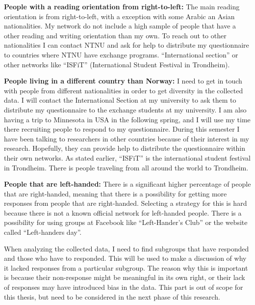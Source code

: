     {\bf People with a reading orientation from right-to-left:} The main reading orientation is from right-to-left, with a exception with some Arabic an Asian nationalities. My network do not include a high sample of people that have a other reading and writing orientation than my own. To reach out to other nationalities I can contact NTNU and ask for help to distribute my questionnaire to countries where NTNU have exchange programs. ``International section'' or other networks like ``ISFiT'' (International Student Festival in Trondheim). 
    
    {\bf People living in a different country than Norway:} I need to get in touch with people from different nationalities in order to get diversity in the collected data. I will contact the International Section at my university to ask them to distribute my questionnaire to the exchange students at my university. I am also having a trip to Minnesota in USA in the following spring, and I will use my time there recruiting people to respond to my questionnaire. During this semester I have been talking to researchers in other countries because of their interest in my research. Hopefully, they can provide help to distribute the questionnaire within their own networks. As stated earlier, ``ISFiT'' is the international student festival in Trondheim. There is people traveling from all around the world to Trondheim. 
    
    {\bf People that are left-handed:} There is a significant higher percentage of people that are right-handed, meaning that there is a possibility for getting more responses from people that are right-handed. Selecting a strategy for this is hard because there is not a known official network for left-handed people. There is a possibility for using groups at Facebook like ``Left-Hander's Club'' or the website called ``Left-handers day''. 

    When analyzing the collected data, I need to find subgroups that have responded and those who have to responded. This will be used to make a discussion of why it lacked responses from a particular subgroup. The reason why this is important is because their non-response might be meaningful in its own right, or their lack of responses may have introduced bias in the data. This part is out of scope for this thesis, but need to be considered in the next phase of this research.

    
    
    
